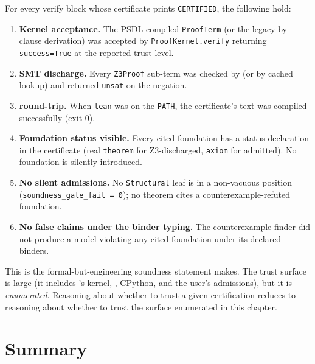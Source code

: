 \begin{theorem}
For every verify block whose certificate prints
\texttt{CERTIFIED}, the following hold:

\begin{enumerate}[leftmargin=1.7em]
  \item \textbf{Kernel acceptance.}  The PSDL-compiled
    \texttt{ProofTerm} (or the legacy by-clause derivation) was
    accepted by \texttt{ProofKernel.verify} returning
    \texttt{success=True} at the reported trust level.

  \item \textbf{SMT discharge.}  Every \texttt{Z3Proof} sub-term
    was checked by \Zthree{} (or by cached lookup) and returned
    \texttt{unsat} on the negation.

  \item \textbf{\Lean{} round-trip.}  When \texttt{lean} was on the
    \texttt{PATH}, the certificate's \Lean{} text was compiled
    successfully (exit 0).

  \item \textbf{Foundation status visible.}  Every cited foundation
    has a status declaration in the certificate (real
    \texttt{theorem} for Z3-discharged, \texttt{axiom} for
    admitted).  No foundation is silently introduced.

  \item \textbf{No silent admissions.}  No \texttt{Structural} leaf
    is in a non-vacuous position
    (\texttt{soundness\_gate\_fail = 0}); no theorem cites a
    counterexample-refuted foundation.

  \item \textbf{No false claims under the binder typing.}  The
    counterexample finder did not produce a model violating any
    cited foundation under its declared binders.
\end{enumerate}
\end{theorem}

This is the formal-but-engineering soundness statement \Deppy{}
makes.  The trust surface is large (it includes \Lean{}'s kernel,
\Zthree{}, CPython, and the user's admissions), but it is
\emph{enumerated}.  Reasoning about whether to trust a given
\Deppy{} certification reduces to reasoning about whether to trust
the surface enumerated in this chapter.

\section{Summary}

